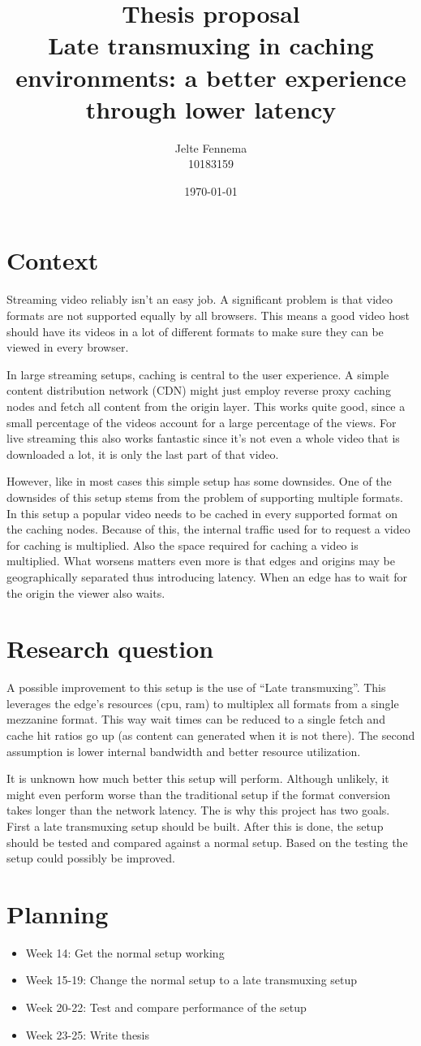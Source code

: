 \documentclass{article}
\title{Thesis proposal\\Late transmuxing in caching environments: a better
experience through lower latency}
\author{Jelte Fennema\\10183159}
\date{\today}
\begin{document}
\maketitle

\section{Context}
Streaming video reliably isn't an easy job. A significant problem is that video
formats are not supported equally by all browsers. This means a good
video host should have its videos in a lot of different formats to make sure
they can be viewed in every browser.

In large streaming setups, caching is central to the user experience. A simple
content distribution network (CDN) might just employ reverse proxy caching nodes
and fetch all content from the origin layer. This works quite good, since a
small percentage of the videos account for a large percentage of the views. For
live streaming this also works fantastic since it's not even a whole video that
is downloaded a lot, it is only the last part of that video.

However, like in most cases this simple setup has some downsides. One of the
downsides of this setup stems from the problem of supporting multiple formats.
In this setup a popular video needs to be cached in every supported format on
the caching nodes. Because of this, the internal traffic used for to request a
video for caching is multiplied. Also the space required for caching a video is
multiplied. What worsens matters even more is that edges and origins may be
geographically separated thus introducing latency. When an edge has to wait for
the origin the viewer also waits.

\section{Research question}
A possible improvement to this setup is the use of ``Late transmuxing''. This
leverages the edge’s resources (cpu, ram) to multiplex all formats from a single
mezzanine format. This way wait times can be reduced to a single fetch and cache
hit ratios go up (as content can generated when it is not there). The second
assumption is lower internal bandwidth and better resource utilization.

It is unknown how much better this setup will perform. Although unlikely, it
might even perform worse than the traditional setup if the format conversion
takes longer than the network latency. The is why this project has two goals.
First a late transmuxing setup should be built. After this is done, the setup
should be tested and compared against a normal setup. Based on the testing the
setup could possibly be improved.

\section{Planning}

\begin{itemize}
    \item Week 14: Get the normal setup working
    \item Week 15-19: Change the normal setup to a late transmuxing setup
    \item Week 20-22: Test and compare performance of the setup
    \item Week 23-25: Write thesis
\end{itemize}
\end{document}
